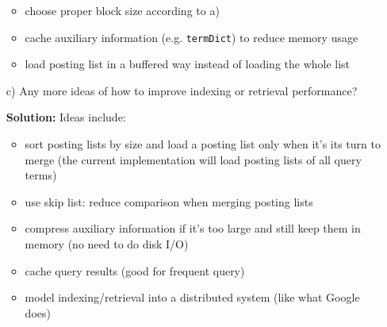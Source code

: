\documentclass{article}
\begin{document}
\begin{itemize}
\begin{itemize}
    \item choose proper block size according to a)
    
    \item cache auxiliary information (e.g. {\texttt{termDict}}) to reduce
    memory usage
    
    \item load posting list in a buffered way instead of loading the whole
    list
  \end{itemize}
  \item[c)] Any more ideas of how to improve indexing or retrieval performance?
  
  \textbf{Solution:} Ideas include:
  \begin{itemize}
    \item sort posting lists by size and load a posting list only when it's
    its turn to merge (the current implementation will load posting lists of
    all query terms)
    
    \item use skip list: reduce comparison when merging posting lists
    
    \item compress auxiliary information if it's too large and still keep them
    in memory (no need to do disk I/O)
    
    \item cache query results (good for frequent query)
    
    \item model indexing/retrieval into a distributed system (like what Google
    does)
  \end{itemize}
\end{itemize}
\end{document}

